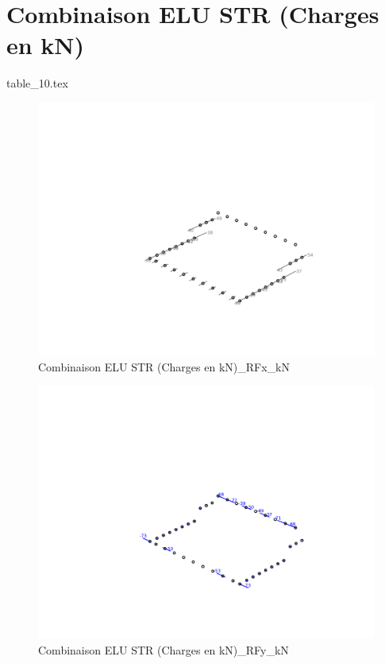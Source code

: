 
    \section{Combinaison ELU STR (Charges en kN)}
    {table_10.tex}

    \begin{figure}[H] %
        \centering %
        \includegraphics[width=\textwidth]{assets/img/graph3D_charges_cas_10_RFx_kN.png} %
        \caption{Combinaison ELU STR (Charges en kN)\_RFx\_kN} %
    \end{figure}

    \begin{figure}[H] %
        \centering %
        \includegraphics[width=\textwidth]{assets/img/graph3D_charges_cas_10_RFy_kN.png} %
        \caption{Combinaison ELU STR (Charges en kN)\_RFy\_kN} %
    \end{figure}

